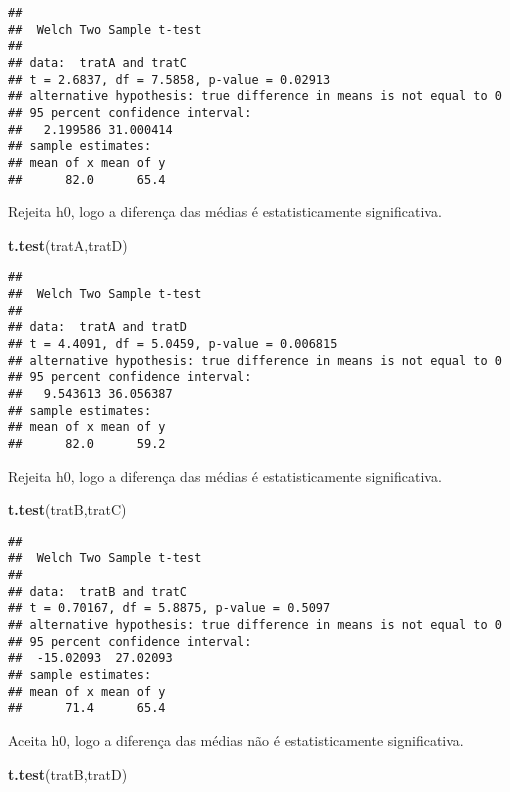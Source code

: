 \documentclass[
]{article}
\newenvironment{Shaded}{\begin{snugshade}}{\end{snugshade}}
\newcommand{\FunctionTok}[1]{\textcolor[rgb]{0.13,0.29,0.53}{\textbf{#1}}}
\newcommand{\NormalTok}[1]{#1}
\begin{document}
\begin{verbatim}
## 
##  Welch Two Sample t-test
## 
## data:  tratA and tratC
## t = 2.6837, df = 7.5858, p-value = 0.02913
## alternative hypothesis: true difference in means is not equal to 0
## 95 percent confidence interval:
##   2.199586 31.000414
## sample estimates:
## mean of x mean of y 
##      82.0      65.4
\end{verbatim}

Rejeita h0, logo a diferença das médias é estatisticamente
significativa.

\begin{Shaded}
\begin{Highlighting}[]
\FunctionTok{t.test}\NormalTok{(tratA,tratD)}
\end{Highlighting}
\end{Shaded}

\begin{verbatim}
## 
##  Welch Two Sample t-test
## 
## data:  tratA and tratD
## t = 4.4091, df = 5.0459, p-value = 0.006815
## alternative hypothesis: true difference in means is not equal to 0
## 95 percent confidence interval:
##   9.543613 36.056387
## sample estimates:
## mean of x mean of y 
##      82.0      59.2
\end{verbatim}

Rejeita h0, logo a diferença das médias é estatisticamente
significativa.

\begin{Shaded}
\begin{Highlighting}[]
\FunctionTok{t.test}\NormalTok{(tratB,tratC)}
\end{Highlighting}
\end{Shaded}

\begin{verbatim}
## 
##  Welch Two Sample t-test
## 
## data:  tratB and tratC
## t = 0.70167, df = 5.8875, p-value = 0.5097
## alternative hypothesis: true difference in means is not equal to 0
## 95 percent confidence interval:
##  -15.02093  27.02093
## sample estimates:
## mean of x mean of y 
##      71.4      65.4
\end{verbatim}

Aceita h0, logo a diferença das médias não é estatisticamente
significativa.

\begin{Shaded}
\begin{Highlighting}[]
\FunctionTok{t.test}\NormalTok{(tratB,tratD)}
\end{Highlighting}
\end{Shaded}
\end{document}
